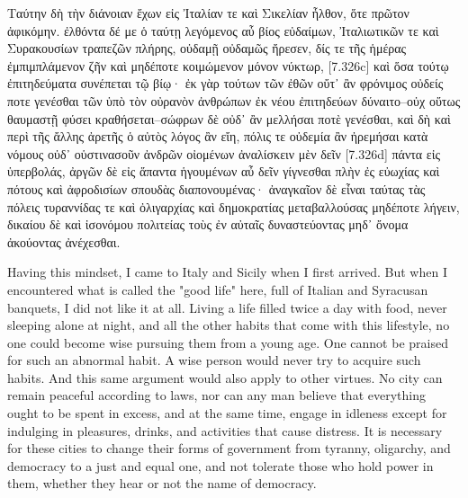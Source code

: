 \documentclass[12pt]{book}
\begin{document}
\begin{pairs}
\begin{Rightside}
\begin{Ancient Greek}
\beginnumbering
\pstart
Ταύτην δὴ τὴν διάνοιαν ἔχων εἰς Ἰταλίαν τε καὶ Σικελίαν ἦλθον, ὅτε πρῶτον ἀφικόμην. ἐλθόντα δέ με ὁ ταύτῃ λεγόμενος αὖ βίος εὐδαίμων, Ἰταλιωτικῶν τε καὶ Συρακουσίων τραπεζῶν πλήρης, οὐδαμῇ οὐδαμῶς ἤρεσεν, δίς τε τῆς ἡμέρας ἐμπιμπλάμενον ζῆν καὶ μηδέποτε κοιμώμενον μόνον νύκτωρ, [7.326c] καὶ ὅσα τούτῳ ἐπιτηδεύματα συνέπεται τῷ βίῳ· ἐκ γὰρ τούτων τῶν ἐθῶν οὔτ᾽ ἂν φρόνιμος οὐδείς ποτε γενέσθαι τῶν ὑπὸ τὸν οὐρανὸν ἀνθρώπων ἐκ νέου ἐπιτηδεύων δύναιτο--οὐχ οὕτως θαυμαστῇ φύσει κραθήσεται--σώφρων δὲ οὐδ᾽ ἂν μελλήσαι ποτὲ γενέσθαι, καὶ δὴ καὶ περὶ τῆς ἄλλης ἀρετῆς ὁ αὐτὸς λόγος ἂν εἴη, πόλις τε οὐδεμία ἂν ἠρεμήσαι κατὰ νόμους οὐδ᾽ οὑστινασοῦν ἀνδρῶν οἰομένων ἀναλίσκειν μὲν δεῖν [7.326d] πάντα εἰς ὑπερβολάς, ἀργῶν δὲ εἰς ἅπαντα ἡγουμένων αὖ δεῖν γίγνεσθαι πλὴν ἐς εὐωχίας καὶ πότους καὶ ἀφροδισίων σπουδὰς διαπονουμένας· ἀναγκαῖον δὲ εἶναι ταύτας τὰς πόλεις τυραννίδας τε καὶ ὀλιγαρχίας καὶ δημοκρατίας μεταβαλλούσας μηδέποτε λήγειν, δικαίου δὲ καὶ ἰσονόμου πολιτείας τοὺς ἐν αὐταῖς δυναστεύοντας μηδ᾽ ὄνομα ἀκούοντας ἀνέχεσθαι. 	
\pend
\endnumbering
\end{Ancient Greek}
\end{Rightside}
\begin{Leftside}
\begin{English}
\beginnumbering
\pstart
Having this mindset, I came to Italy and Sicily when I first arrived. But when I encountered what is called the "good life" here, full of Italian and Syracusan banquets, I did not like it at all. Living a life filled twice a day with food, never sleeping alone at night, and all the other habits that come with this lifestyle, no one could become wise pursuing them from a young age. One cannot be praised for such an abnormal habit. A wise person would never try to acquire such habits. And this same argument would also apply to other virtues. No city can remain peaceful according to laws, nor can any man believe that everything ought to be spent in excess, and at the same time, engage in idleness except for indulging in pleasures, drinks, and activities that cause distress. It is necessary for these cities to change their forms of government from tyranny, oligarchy, and democracy to a just and equal one, and not tolerate those who hold power in them, whether they hear or not the name of democracy.
\pend
\endnumbering
\end{English}
\end{Leftside}
\end{pairs}
\end{document}
